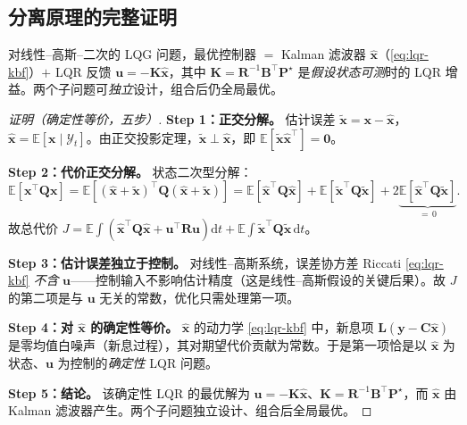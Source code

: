 \subsection{分离原理的完整证明}
\label{sec:lqr-sep-proof}

\begin{theorem}\label{thm:lqr-separation}
对线性--高斯--二次的 LQG 问题，最优控制器 $=$ Kalman 滤波器 $\hat{\mathbf x}$（\cref{eq:lqr-kbf}）$+$ LQR 反馈 $\mathbf u=-\mathbf K\hat{\mathbf x}$，其中 $\mathbf K=\mathbf R^{-1}\mathbf B^\top\mathbf P^\star$ 是\emph{假设状态可测}时的 LQR 增益。两个子问题可\emph{独立}设计，组合后仍全局最优。
\end{theorem}

\begin{proof}[证明（确定性等价，五步）]
\textbf{Step 1：正交分解。} 估计误差 $\tilde{\mathbf x}=\mathbf x-\hat{\mathbf x}$，$\hat{\mathbf x}=\mathbb E[\mathbf x\mid\mathcal Y_t]$。由正交投影定理，$\tilde{\mathbf x}\perp\hat{\mathbf x}$，即 $\mathbb E[\tilde{\mathbf x}\hat{\mathbf x}^\top]=\mathbf0$。

\textbf{Step 2：代价正交分解。} 状态二次型分解：
\begin{equation}
  \mathbb E[\mathbf x^\top\mathbf Q\mathbf x]=\mathbb E[(\hat{\mathbf x}+\tilde{\mathbf x})^\top\mathbf Q(\hat{\mathbf x}+\tilde{\mathbf x})]=\mathbb E[\hat{\mathbf x}^\top\mathbf Q\hat{\mathbf x}]+\mathbb E[\tilde{\mathbf x}^\top\mathbf Q\tilde{\mathbf x}]+2\underbrace{\mathbb E[\hat{\mathbf x}^\top\mathbf Q\tilde{\mathbf x}]}_{=\,0}.
  \label{eq:lqr-cost-split}
\end{equation}
故总代价 $J=\mathbb E\!\int(\hat{\mathbf x}^\top\mathbf Q\hat{\mathbf x}+\mathbf u^\top\mathbf R\mathbf u)\mathrm dt+\mathbb E\!\int\tilde{\mathbf x}^\top\mathbf Q\tilde{\mathbf x}\,\mathrm dt$。

\textbf{Step 3：估计误差独立于控制。} 对线性--高斯系统，误差协方差 Riccati \cref{eq:lqr-kbf} \emph{不含} $\mathbf u$——控制输入不影响估计精度（这是线性--高斯假设的关键后果）。故 $J$ 的第二项是与 $\mathbf u$ 无关的常数，优化只需处理第一项。

\textbf{Step 4：对 $\hat{\mathbf x}$ 的确定性等价。} $\hat{\mathbf x}$ 的动力学 \cref{eq:lqr-kbf} 中，新息项 $\mathbf L(\mathbf y-\mathbf C\hat{\mathbf x})$ 是零均值白噪声（新息过程），其对期望代价贡献为常数。于是第一项恰是以 $\hat{\mathbf x}$ 为状态、$\mathbf u$ 为控制的\emph{确定性} LQR 问题。

\textbf{Step 5：结论。} 该确定性 LQR 的最优解为 $\mathbf u=-\mathbf K\hat{\mathbf x}$、$\mathbf K=\mathbf R^{-1}\mathbf B^\top\mathbf P^\star$，而 $\hat{\mathbf x}$ 由 Kalman 滤波器产生。两个子问题独立设计、组合后全局最优。
\end{proof}

